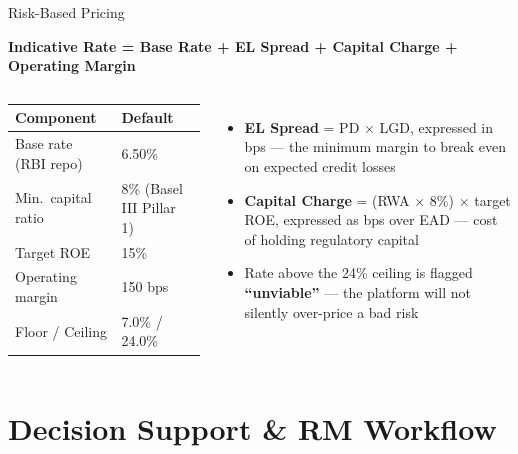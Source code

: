 \documentclass[9pt,aspectratio=169]{beamer}
\begin{document}
\begin{frame}{Risk-Based Pricing}
\vspace{-2pt}
\begin{center}
\large\textbf{Indicative Rate = Base Rate + EL Spread + Capital Charge + Operating Margin}
\end{center}
\vspace{8pt}
\begin{columns}[T]
    \footnotesize
    \begin{tabular}{ll}
      \toprule
      \textbf{Component} & \textbf{Default}\\
      \midrule
      Base rate (RBI repo)  & 6.50\%\\
      Min.\ capital ratio   & 8\% (Basel III Pillar 1)\\
      Target ROE            & 15\%\\
      Operating margin      & 150 bps\\
      Floor / Ceiling        & 7.0\% / 24.0\%\\
      \bottomrule
    \end{tabular}
    \begin{itemize}\setlength\itemsep{4pt}
      \footnotesize
      \item[\small$\bullet$] \textbf{EL Spread} = PD $\times$ LGD, expressed in bps --- the
            minimum margin to break even on expected credit losses
      \item[\small$\bullet$] \textbf{Capital Charge} = (RWA $\times$ 8\%) $\times$ target ROE,
            expressed as bps over EAD --- cost of holding regulatory capital
      \item[\small$\bullet$] Rate above the 24\% ceiling is flagged \textbf{``unviable''} ---
            the platform will not silently over-price a bad risk
    \end{itemize}
\end{columns}
\end{frame}

\section{Decision Support \& RM Workflow}
\end{document}
